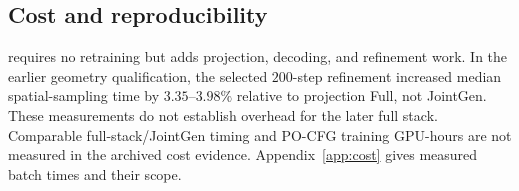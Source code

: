 \subsection{Cost and reproducibility}
\label{sec:exp:cost}
\pcdg requires no retraining but adds projection, decoding, and refinement work.
In the earlier geometry qualification, the selected $200$-step refinement
increased median spatial-sampling time by $3.35$--$3.98\%$ relative to projection
Full, not JointGen. These measurements do not establish overhead for the later
full stack. Comparable full-stack/JointGen timing and PO-CFG training GPU-hours
are not measured in the archived cost evidence.
Appendix~\ref{app:cost} gives measured batch times and their scope.
